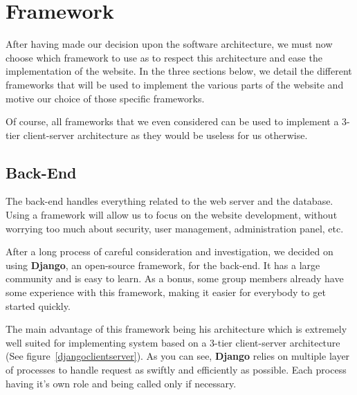 \section{Framework}

After having made our decision upon the software architecture, we must now
choose which framework to use as to respect this architecture and ease the
implementation of the website. In the three sections below, we detail the
different frameworks that will be used to implement the various parts of
the website and motive our choice of those specific frameworks. \newline

Of course, all frameworks that we even considered can be used to implement
a 3-tier client-server architecture as they would be useless for us
otherwise.

\subsection{Back-End}

The back-end handles everything related to the web server and the database.
Using a framework will allow us to focus on the website development,
without worrying too much about security, user management, administration
panel, etc.\newline

After a long process of careful consideration and investigation, we decided
on using \textbf{Django}, an open-source framework, for the back-end. It
has a large community and is easy to learn. As a bonus, some group members
already have some experience with this framework, making it easier for
everybody to get started quickly.\newline

The main advantage of this framework being his architecture which is
extremely well suited for implementing system based on a 3-tier
client-server architecture (See figure~\ref{djangoclientserver}). As you can see, \textbf{Django}
relies on multiple layer of processes to handle request as swiftly and
efficiently as possible. Each process having it's own role and being called
only if necessary.

